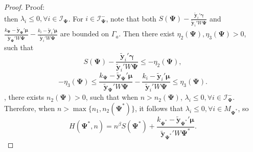 \documentclass[final,11pt,3p]{article}\usepackage{setspace}
\begin{document}
\begin{proof}{Proof:}
\begin{equation*}
\end{equation*}
then $\lambda_i \le 0, \forall i \in \mathcal{I}_{\boldsymbol{\Psi}}$. For $i \in \mathcal{I}_{\boldsymbol{\Psi}}^-$, note that both $S(\boldsymbol{\Psi})-\frac{ \tilde{\boldsymbol{y}}_i'\boldsymbol{\gamma} }{ \tilde{\boldsymbol{y}}_i' W \boldsymbol{\Psi}} $ and $\frac{k_{\boldsymbol{\Psi}}- \tilde{\boldsymbol{y}}_{\boldsymbol{\Psi}}' \boldsymbol{\mu}}{ \tilde{\boldsymbol{y}}_{\boldsymbol{\Psi}}' W \boldsymbol{\Psi}} -
\frac{k_i- \tilde{\boldsymbol{y}}_i' \boldsymbol{\mu}}{ \tilde{\boldsymbol{y}}_i' W \boldsymbol{\Psi}}$ are bounded on $\Gamma_a$. Then there exist $\eta_2(\boldsymbol{\Psi}), \eta_3(\boldsymbol{\Psi}) > 0$, such that
\begin{equation*}
S(\boldsymbol{\Psi})-\frac{ \tilde{\boldsymbol{y}}_i'\boldsymbol{\gamma} }{ \tilde{\boldsymbol{y}}_i' W \boldsymbol{\Psi}} \le -\eta_2(\boldsymbol{\Psi}),
\end{equation*}
\begin{equation*}
-\eta_3(\boldsymbol{\Psi}) \le  \frac{k_{\boldsymbol{\Psi}}- \tilde{\boldsymbol{y}}_{\boldsymbol{\Psi}}' \boldsymbol{\mu}}{ \tilde{\boldsymbol{y}}_{\boldsymbol{\Psi}}' W \boldsymbol{\Psi}} -
\frac{k_i- \tilde{\boldsymbol{y}}_i' \boldsymbol{\mu}}{ \tilde{\boldsymbol{y}}_i' W \boldsymbol{\Psi}} \le \eta_3(\boldsymbol{\Psi}).
\end{equation*}
{{}}, there exists $n_2(\boldsymbol{\Psi})> 0$, such that when $n > n_2(\boldsymbol{\Psi})$, $\lambda_i \le 0, \forall i \in \mathcal{I}_{\boldsymbol{\Psi}}^-$. Therefore, when $n > \max \{n_1, n_2(\boldsymbol{\Psi}^*)\}$, it follows that $\lambda_i \le 0, \forall i \in M_{\boldsymbol{\Psi}^*}$, so
\begin{equation}\label{Hstar}
H(\boldsymbol{\Psi}^*, n) = n^{\beta} S(\boldsymbol{\Psi}^*)+ \frac{k_{\boldsymbol{\Psi}^*}- \tilde{\boldsymbol{y}}_{\boldsymbol{\Psi}^*}' \boldsymbol{\mu}}{ \tilde{\boldsymbol{y}}_{\boldsymbol{\Psi}^*}' W \boldsymbol{\Psi}^*}.
\end{equation}


\end{proof}
\end{document}
